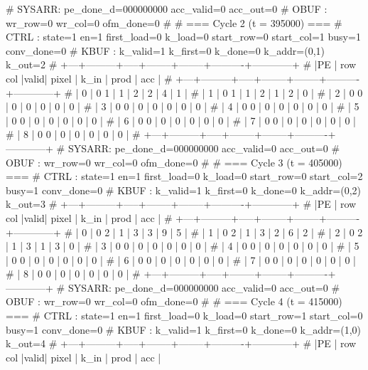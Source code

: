 # SYSARR: pe_done_d=000000000 acc_valid=0 acc_out=0
# OBUF : wr_row=0 wr_col=0 ofm_done=0
# 
# === Cycle 2  (t = 395000) ===
# CTRL : state=1 en=1 first_load=0 k_load=0 start_row=0 start_col=1 busy=1 conv_done=0
# KBUF : k_valid=1 k_first=0 k_done=0 k_addr=(0,1) k_out=2
# +---+---------+-----+--------+--------+----------+------------+
# |PE | row col |valid| pixel  |  k_in  |   prod   |    acc     |
# +---+---------+-----+--------+--------+----------+------------+
# | 0 |   0   1 |  1  |      2 |      2 |        4 |          1 |
# | 1 |   0   1 |  1  |      2 |      1 |        2 |          0 |
# | 2 |   0   0 |  0  |      0 |      0 |        0 |          0 |
# | 3 |   0   0 |  0  |      0 |      0 |        0 |          0 |
# | 4 |   0   0 |  0  |      0 |      0 |        0 |          0 |
# | 5 |   0   0 |  0  |      0 |      0 |        0 |          0 |
# | 6 |   0   0 |  0  |      0 |      0 |        0 |          0 |
# | 7 |   0   0 |  0  |      0 |      0 |        0 |          0 |
# | 8 |   0   0 |  0  |      0 |      0 |        0 |          0 |
# +---+---------+-----+--------+--------+----------+------------+
# SYSARR: pe_done_d=000000000 acc_valid=0 acc_out=0
# OBUF : wr_row=0 wr_col=0 ofm_done=0
# 
# === Cycle 3  (t = 405000) ===
# CTRL : state=1 en=1 first_load=0 k_load=0 start_row=0 start_col=2 busy=1 conv_done=0
# KBUF : k_valid=1 k_first=0 k_done=0 k_addr=(0,2) k_out=3
# +---+---------+-----+--------+--------+----------+------------+
# |PE | row col |valid| pixel  |  k_in  |   prod   |    acc     |
# +---+---------+-----+--------+--------+----------+------------+
# | 0 |   0   2 |  1  |      3 |      3 |        9 |          5 |
# | 1 |   0   2 |  1  |      3 |      2 |        6 |          2 |
# | 2 |   0   2 |  1  |      3 |      1 |        3 |          0 |
# | 3 |   0   0 |  0  |      0 |      0 |        0 |          0 |
# | 4 |   0   0 |  0  |      0 |      0 |        0 |          0 |
# | 5 |   0   0 |  0  |      0 |      0 |        0 |          0 |
# | 6 |   0   0 |  0  |      0 |      0 |        0 |          0 |
# | 7 |   0   0 |  0  |      0 |      0 |        0 |          0 |
# | 8 |   0   0 |  0  |      0 |      0 |        0 |          0 |
# +---+---------+-----+--------+--------+----------+------------+
# SYSARR: pe_done_d=000000000 acc_valid=0 acc_out=0
# OBUF : wr_row=0 wr_col=0 ofm_done=0
# 
# === Cycle 4  (t = 415000) ===
# CTRL : state=1 en=1 first_load=0 k_load=0 start_row=1 start_col=0 busy=1 conv_done=0
# KBUF : k_valid=1 k_first=0 k_done=0 k_addr=(1,0) k_out=4
# +---+---------+-----+--------+--------+----------+------------+
# |PE | row col |valid| pixel  |  k_in  |   prod   |    acc     |

